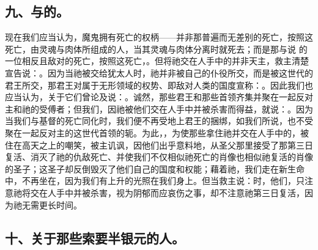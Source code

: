
\subsection{九、与的。}

现在我们应当认为，魔鬼拥有死亡的权柄——并非那普遍而无差别的死亡，按照这死亡，由灵魂与肉体所组成的人，当其灵魂与肉体分离时就死去；而是那与说 的一位相反且敌对的死亡，按照这死亡，。但将祂交在人手中的并非天主，救主清楚宣告说：。因为当祂被交给犹太人时，祂并非被自己的仆役所交，而是被这世代的君王所交，那君王对属于无形领域的权势、即敌对人类的国度宣称：。因此我们也应当认为，关于它们曾论及说：。诚然，那些君王和那些首领齐集并聚在一起反对主和祂的受傅者；但我们，因祂被他们交在人手中并被杀害而得益，就说：。因为当我们与基督的死亡同化时，我们便不再受地上君王的捆绑，如我们所说，也不受聚在一起反对主的这世代首领的轭。为此，，为使那些拿住祂并交在人手中的，被住在高天之上的嘲笑，被主讥讽，因他们出乎意料地，从圣父那里接受了那第三日复活、消灭了祂的仇敌死亡、并使我们不仅相似祂死亡的肖像也相似祂复活的肖像的圣子；这圣子却反倒毁灭了他们自己的国度和权能；藉着祂，我们走在新生命中，不再坐在，因为我们有上升的光照在我们身上。但当救主说：时，他们，只注意祂将交在人手中并被杀害，视为阴郁而应哀伤之事，却不注意祂第三日复活，因为祂无需更长时间。\par


\subsection{十、关于那些索要半银元的人。}

